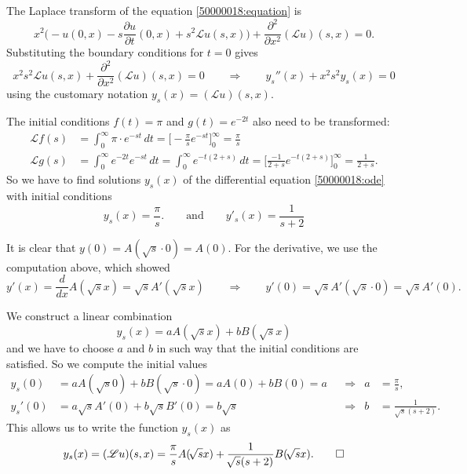 \begin{loesung}
\begin{teilaufgaben}
\item
The Laplace transform of the equation \eqref{50000018:equation} is
\[
x^2\biggl(
-u(0,x) -s\frac{\partial u}{\partial t}(0,x) +s^2\mathscr{L}u(s,x)
\biggr)
+
\frac{\partial^2}{\partial x^2} (\mathscr{L}u)(s,x)
=
0.
\]
Substituting the boundary conditions for $t=0$ gives
\begin{equation}
x^2s^2\mathscr{L}u(s,x)
+
\frac{\partial^2}{\partial x^2} (\mathscr{L}u)(s,x)
=
0
\qquad\Rightarrow\qquad
y_s''(x) + x^2s^2y_s(x)=0
\label{50000018:ode}
\end{equation}
using the customary notation $y_s(x)=(\mathscr{L}u)(s,x)$.

The initial conditions
$f(t)=\pi$
and
$g(t)=e^{-2t}$
also need to be transformed:
\begin{align*}
\mathscr{L}f(s)
&=
\int_0^\infty \pi\cdot e^{-st}\,dt
=
\biggl[ -\frac{\pi}{s}e^{-st}\biggr]_0^\infty
=
\frac{\pi}{s}
\\
\mathscr{L}g(s)
&=
\int_0^\infty e^{-2t} e^{-st}\,dt
=
\int_0^\infty e^{-t(2+s)} \,dt
=
\biggl[
\frac{-1}{2+s}e^{-t(2+s)}
\biggr]_0^\infty
=
\frac1{2+s}.
\end{align*}
So we have to find solutions $y_s(x)$ of the differential equation
\eqref{50000018:ode} with initial conditions
\[
y_s(x) = \frac{\pi}{s}.
\qquad
\text{and}
\qquad
y'_s(x) = \frac1{s+2}
\]
\item
It is clear that $y(0)=A(\!\sqrt{s}\cdot 0)=A(0)$.
For the derivative, we use the computation above, which showed
\[
y'(x) = \frac{d}{dx} A(\!\sqrt{s}x) = \sqrt{s}A'(\!\sqrt{s}x)
\qquad\Rightarrow\qquad
y'(0)=\sqrt{s}A'(\!\sqrt{s}\cdot 0)=\sqrt{s}A'(0).
\]
\item
We construct a linear combination 
\[
y_s(x) = aA(\!\sqrt{s}x) + b B(\!\sqrt{s}x)
\]
and we have to choose $a$ and $b$ in such way that the initial conditions
are satisfied.
So we compute the initial values
\begin{align*}
y_s(0) &= aA(\!\sqrt{s}0) + bB(\!\sqrt{s}\cdot 0) = aA(0) + bB(0) = a
&&\Rightarrow& a &= \frac{\pi}s,
\\
y_s'(0)&= a\sqrt{s} A'(0) + b\sqrt{s} B'(0) = b\sqrt{s}
&&\Rightarrow& b &= \frac{1}{\!\sqrt{s}(s+2)}.
\end{align*}
This allows us to write the function $y_s(x)$ as
\[
y_s(x) = (\mathscr{L}u)(s,x)
=
\frac{\pi}{s}
A(\!\sqrt{s}x)
+
\frac{1}{\!\sqrt{s}(s+2)}B(\!\sqrt{s}x).
\qedhere
\]
\end{teilaufgaben}
\end{loesung}


